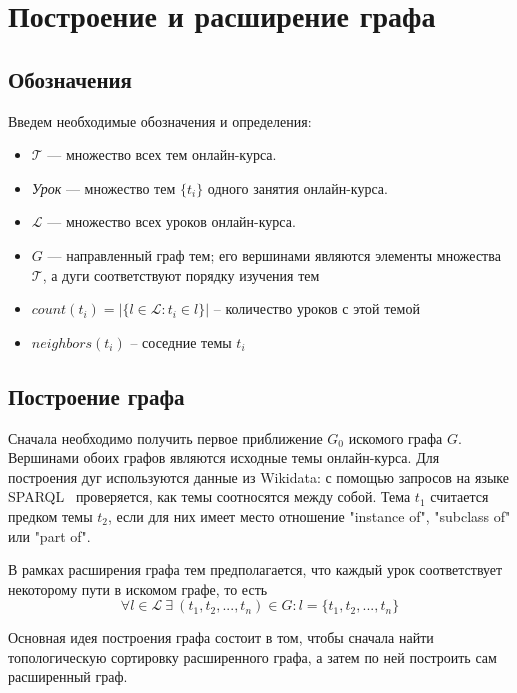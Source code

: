 \documentclass[14pt]{matmex-diploma-custom}
\begin{document}
\section{Построение и расширение графа}
\subsection{Обозначения}
Введем необходимые обозначения и определения:

\begin{itemize}
\item $\mathcal{T}$ --- множество всех тем онлайн-курса.
    \item \textit{Урок} --- множество тем $\{t_i\}$ одного занятия онлайн-курса.
    \item $\mathcal{L}$ --- множество всех уроков онлайн-курса.
    \item $G$ --- направленный граф тем; его вершинами являются элементы множества $\mathcal{T}$, а дуги соответствуют порядку изучения тем
    \item $count(t_i) = |\{l \in \mathcal{L} : t_i \in l \}|$ -- количество уроков с этой темой
    \item $neighbors(t_i)$ -- соседние темы $t_i$ \\ %
\end{itemize}

\subsection{Построение графа}

Сначала необходимо получить первое приближение $G_0$ искомого графа $G$. Вершинами обоих графов являются исходные темы онлайн-курса. Для построения дуг используются данные из Wikidata: с помощью запросов на языке SPARQL~\cite{SPARQL} проверяется, как темы соотносятся между собой. Тема $t_1$ считается предком темы $t_2$, если для них имеет место отношение "instance of", "subclass of" или "part of". 

В рамках расширения графа тем предполагается, что каждый урок соответствует некоторому пути в искомом графе, то есть 
$$\forall l \in \mathcal{L} ~\exists~ (t_1, t_2, ..., t_n) \in G : l = \{t_1, t_2, ..., t_n\}$$

Основная идея построения графа состоит в том, чтобы сначала найти топологическую сортировку расширенного графа, а затем по ней построить сам расширенный граф.
\end{document}
